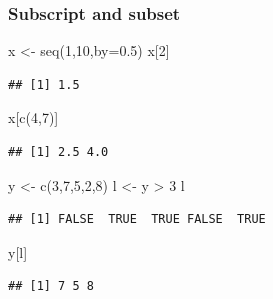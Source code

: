 \documentclass[]{article}
\newenvironment{Shaded}{\begin{snugshade}}{\end{snugshade}}
\newcommand{\AttributeTok}[1]{\textcolor[rgb]{0.77,0.63,0.00}{#1}}
\newcommand{\DecValTok}[1]{\textcolor[rgb]{0.00,0.00,0.81}{#1}}
\newcommand{\FloatTok}[1]{\textcolor[rgb]{0.00,0.00,0.81}{#1}}
\newcommand{\FunctionTok}[1]{\textcolor[rgb]{0.00,0.00,0.00}{#1}}
\newcommand{\NormalTok}[1]{#1}
\newcommand{\OtherTok}[1]{\textcolor[rgb]{0.56,0.35,0.01}{#1}}
\newcommand{\SpecialCharTok}[1]{\textcolor[rgb]{0.00,0.00,0.00}{#1}}
\begin{document}
\hypertarget{subscript-and-subset}{%
\subsubsection{Subscript and subset}\label{subscript-and-subset}}

\begin{Shaded}
\begin{Highlighting}[]
\NormalTok{x }\OtherTok{\textless{}{-}} \FunctionTok{seq}\NormalTok{(}\DecValTok{1}\NormalTok{,}\DecValTok{10}\NormalTok{,}\AttributeTok{by=}\FloatTok{0.5}\NormalTok{)}
\NormalTok{x[}\DecValTok{2}\NormalTok{]}
\end{Highlighting}
\end{Shaded}

\begin{verbatim}
## [1] 1.5
\end{verbatim}

\begin{Shaded}
\begin{Highlighting}[]
\NormalTok{x[}\FunctionTok{c}\NormalTok{(}\DecValTok{4}\NormalTok{,}\DecValTok{7}\NormalTok{)]}
\end{Highlighting}
\end{Shaded}

\begin{verbatim}
## [1] 2.5 4.0
\end{verbatim}

\begin{Shaded}
\begin{Highlighting}[]
\NormalTok{y }\OtherTok{\textless{}{-}} \FunctionTok{c}\NormalTok{(}\DecValTok{3}\NormalTok{,}\DecValTok{7}\NormalTok{,}\DecValTok{5}\NormalTok{,}\DecValTok{2}\NormalTok{,}\DecValTok{8}\NormalTok{)}
\NormalTok{l }\OtherTok{\textless{}{-}}\NormalTok{ y }\SpecialCharTok{\textgreater{}} \DecValTok{3}
\NormalTok{l}
\end{Highlighting}
\end{Shaded}

\begin{verbatim}
## [1] FALSE  TRUE  TRUE FALSE  TRUE
\end{verbatim}

\begin{Shaded}
\begin{Highlighting}[]
\NormalTok{y[l]}
\end{Highlighting}
\end{Shaded}

\begin{verbatim}
## [1] 7 5 8
\end{verbatim}
\end{document}
